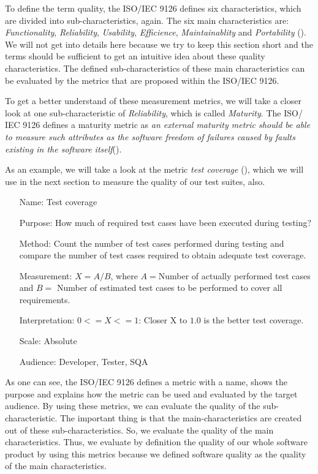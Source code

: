 To define the term quality, the ISO/IEC 9126 defines six characteristics, which are divided into sub-characteristics, again. The six main characteristics are: \emph{Functionality}, \emph{Reliability}, \emph{Usability}, \emph{Efficience}, \emph{Maintainablity} and \emph{Portability} (\cite{jung2004measuring}). We will not get into details here because we try to keep this section short and the terms should be sufficient to get an intuitive idea about these quality characteristics. The defined sub-characteristics of these main characteristics can be evaluated by the metrics that are proposed within the ISO/IEC 9126. 

To get a better understand of these measurement metrics, we will take a closer look at one sub-characteristic of \emph{Reliability}, which is called \emph{Maturity}. The ISO/ IEC 9126 defines a maturity metric as \glqq\emph{an external maturity metric should be able to measure such attributes as the software freedom of failures caused by faults existing in the software itself}\grqq (\cite{ISOIEC9126}).

As an example, we will take a look at the metric \emph{test coverage} (\cite{ISOIEC9126}), which we will use in the next section to measure the quality of our test suites, also. 

\begin{itemize}
	\item[Name:] Test coverage
	\item[Purpose:] How much of required test cases have been executed during testing?
	\item[Method:] Count the number of test cases performed during testing and compare the number of test cases required to obtain adequate test coverage.
	\item[Measurement:] $X=A/B$, where $A=$Number of actually performed test cases and $B=$ Number of estimated test cases to be performed to cover all requirements.
	\item[Interpretation:] $0<=X<=1$: Closer X to $1.0$ is the better test coverage.
	\item[Scale:] Absolute
	\item[Audience:] Developer, Tester, SQA
\end{itemize}

As one can see, the ISO/IEC 9126 defines a metric with a name, shows the purpose and explains how the metric can be used and evaluated by the target audience. By using these metrics, we can evaluate the quality of the sub-characteristic. The important thing is that the main-characteristics are created out of these sub-characteristics. So, we evaluate the quality of the main characteristics. Thus, we evaluate by definition the quality of our whole software product by using this metrics because we defined software quality as the quality of the main characteristics.        


